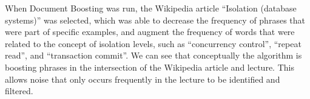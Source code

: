 When Document Boosting was run, the Wikipedia article ``Isolation (database systems)'' was selected, which was able to decrease the frequency of phrases that were part of specific examples, and augment the frequency of words that were related to the concept of isolation levels, such as ``concurrency control'', ``repeat read'', and ``transaction commit''. We can see that conceptually the algorithm is boosting phrases in the intersection of the Wikipedia article and lecture. This allows noise that only occurs frequently in the lecture to be identified and filtered.

